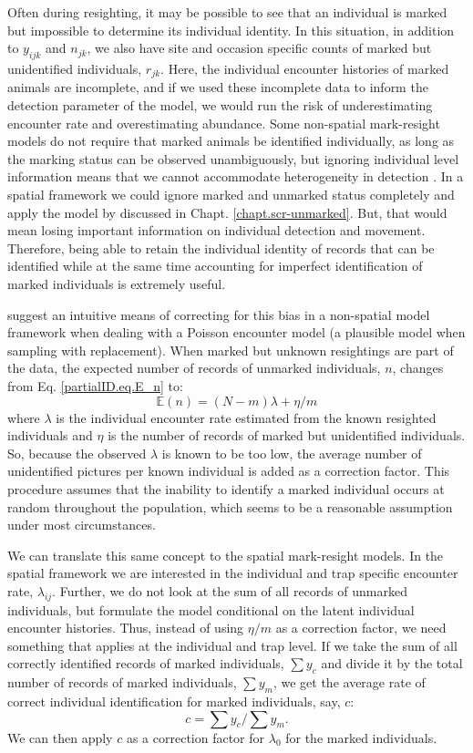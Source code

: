 Often during resighting, it may be possible to see that an individual
is marked but impossible to determine its individual identity. In this
situation, in addition to $y_{ijk}$ and $n_{jk}$, we also have
site and occasion specific counts of marked but unidentified
individuals, $r_{jk}$. Here, the individual encounter histories of
marked animals are incomplete, and if we used these incomplete data to
inform the detection parameter of the model, we would run the risk of
underestimating 
encounter rate and overestimating
abundance. Some non-spatial mark-resight models do not require that
marked animals be identified individually, as long as the marking
status can be observed unambiguously, but ignoring individual level
information means that we cannot accommodate heterogeneity in
detection \citep{mcclintock_white:2010}. In a spatial framework we
could ignore marked and unmarked status completely and apply the model
by \citet{chandler_royle:2012} discussed in
Chapt. \ref{chapt.scr-unmarked}. But, that would mean losing important
information on individual detection and movement. Therefore, being
able to retain the individual identity of records that can be
identified while at the same time accounting for imperfect
identification of marked individuals is extremely useful.

\citet{mcclintock_etal:2009biometrics,mcclintock_etal:2009mdp} suggest
an intuitive means of correcting for this bias in a non-spatial model
framework when dealing with a Poisson encounter model 
(a plausible
model when sampling
with replacement). When marked but unknown resightings are part of the
data, the expected number of records of unmarked individuals, $n$, changes from Eq. \ref{partialID.eq.E_n} to:
\[
\mathbb{E}(n) = (N-m) { \lambda  + \eta/m}
\]
where $\lambda$ is the individual encounter rate estimated from the known resighted individuals and $\eta$ is the number of records of marked but unidentified individuals. So, because the observed $\lambda$ is known to be too low, the average number of unidentified pictures per known individual is added as a correction factor. This procedure assumes that the inability to identify a marked individual occurs at random throughout the population, which seems to be a reasonable assumption under most circumstances.


We can translate this same concept to the spatial mark-resight
models. In the spatial framework we are interested in the individual
and trap specific encounter rate, $\lambda_{ij}$. Further, we do not
look at the sum of all records of unmarked individuals, but formulate
the model conditional on the latent individual encounter
histories. Thus, instead of using $\eta/m$ as a correction factor, we
need something that applies at the individual and trap level. If we
take the sum of all correctly identified records of marked
individuals, $\sum y_c$ and divide it by the total number of records
of marked individuals, $\sum y_m$, we get the average rate of correct
individual identification for marked individuals, say, $c$:
\[
c = \sum y_c/\sum y_m.
\]
We can then apply $c$ as a correction factor for $\lambda_0$ for the marked individuals.

